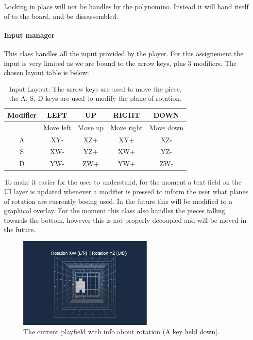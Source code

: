 \documentclass{article}
\begin{document}
Locking in place will not be handles by the polynomino. Instead it will hand itself of to the board, and be dissassembled.


\paragraph{Input manager}
This class handles all the input provided by the player. For this assignement the input is very limited as we are bound to the arrow keys, plus 3 modifiers. The chosen layout table is below:
\begin{table}[H]
    \centering
    \begin{tabular}{|c|c|c|c|c|}
    \hline
    Modifier & LEFT & UP & RIGHT& DOWN\\
    \hline
     & Move left & Move up & Move right & Move down\\
    A & XY- & XZ+ & XY+ & XZ-\\
    S & XW- & YZ+ & XW+ & YZ-\\
    D & YW- & ZW+ & YW+ & ZW-\\
    \hline
    \end{tabular}
    \caption{Input Layout: The arrow keys are used to move the piece, the A, S, D keys are used to modify the plane of rotation.}
    \label{tab:input}
\end{table}
To make it easier for the user to understand, for the moment a text field on the UI layer is updated whenever a modifier is pressed to inform the user what planes of rotation are currently beeing used. In the future this will be modified to a graphical overlay.
For the moment this class also handles the pieces falling towards the bottom, however this is not properly decoupled and will be moved in the future.
\begin{figure}
    \centering
    \includegraphics[width=0.6\textwidth]{./Dev/play_with_pointers.png}
    \caption{The current playfield with info about rotation (A key held down).}
    \label{fig:input}
\end{figure}
\end{document}
